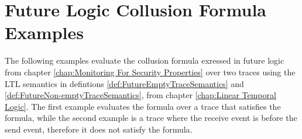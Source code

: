 \chapter{Future Logic Collusion Formula Examples}
\label{app:FutureLogicCollusionFormulaExamples}

The following examples evaluate the collusion formula exressed in future logic from chapter \ref{chap:Monitoring For Security Properties} over two traces using the LTL semantics in defintions \ref{def:FutureEmptyTraceSemantics} and \ref{def:FutureNon-emptyTraceSemantics}, from chapter \ref{chap:Linear Temporal Logic}.  The first example evaluates the formula over a trace that satisfies the formula, while the second example is a trace where the receive event is before the send event, therefore it does not satisfy the formula. 

